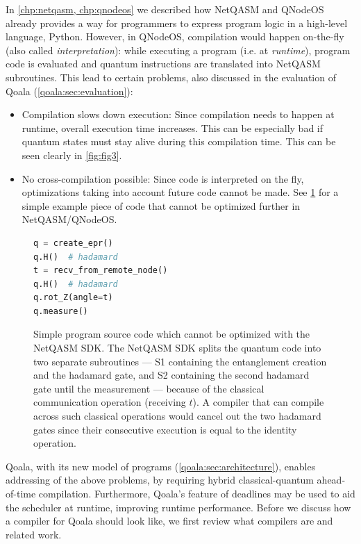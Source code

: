 In \cref{chp:netqasm, chp:qnodeos} we described how NetQASM and QNodeOS already provides a way for programmers to express program logic in a high-level language, Python.
However, in \ac{QNodeOS}, compilation would happen on-the-fly (also called \emph{interpretation}):
while executing a program (i.e. at \emph{runtime}), program code is evaluated and quantum instructions are translated into NetQASM subroutines.
This lead to certain problems, also discussed in the evaluation of Qoala (\cref{qoala:sec:evaluation}):
\begin{itemize}
  \item Compilation slows down execution:
    Since compilation needs to happen at runtime, overall execution time increases.
    This can be especially bad if quantum states must stay alive during this compilation time.
    This can be seen clearly in \cref{fig:fig3}.
  \item No cross-compilation possible:
    Since code is interpreted on the fly, optimizations taking into account future code cannot be made. See \cref{compiler:lst:hybrid} for a simple example piece of code that cannot be optimized further in NetQASM/QNodeOS.
\end{itemize}

\begin{figure}[t]
  \centering
  \begin{lstlisting}[language=Python]
q = create_epr()
q.H()  # hadamard
t = recv_from_remote_node()
q.H()  # hadamard
q.rot_Z(angle=t)
q.measure()
  \end{lstlisting}
  \caption{Simple program source code which cannot be optimized with the NetQASM SDK.
    The NetQASM SDK splits the quantum code into two separate subroutines ---
    S1 containing the entanglement creation and the hadamard gate, and
    S2 containing the second hadamard gate until the measurement ---
    because of the classical communication operation (receiving $t$).
    A compiler that can compile across such classical operations would cancel out the two hadamard gates since their consecutive execution is equal to the identity operation.
  }
  \label{compiler:lst:hybrid}
\end{figure}


Qoala, with its new model of programs (\cref{qoala:sec:architecture}), enables addressing of the above problems, by requiring hybrid classical-quantum ahead-of-time compilation.
Furthermore, Qoala's feature of deadlines may be used to aid the scheduler at runtime, improving runtime performance.
Before we discuss how a compiler for Qoala should look like, we first review what compilers are and related work.


